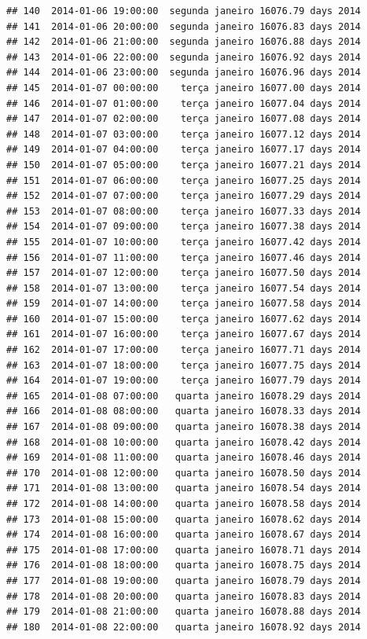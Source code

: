 \documentclass[]{book}
\begin{document}
\begin{verbatim}
## 140  2014-01-06 19:00:00  segunda janeiro 16076.79 days 2014
## 141  2014-01-06 20:00:00  segunda janeiro 16076.83 days 2014
## 142  2014-01-06 21:00:00  segunda janeiro 16076.88 days 2014
## 143  2014-01-06 22:00:00  segunda janeiro 16076.92 days 2014
## 144  2014-01-06 23:00:00  segunda janeiro 16076.96 days 2014
## 145  2014-01-07 00:00:00    terça janeiro 16077.00 days 2014
## 146  2014-01-07 01:00:00    terça janeiro 16077.04 days 2014
## 147  2014-01-07 02:00:00    terça janeiro 16077.08 days 2014
## 148  2014-01-07 03:00:00    terça janeiro 16077.12 days 2014
## 149  2014-01-07 04:00:00    terça janeiro 16077.17 days 2014
## 150  2014-01-07 05:00:00    terça janeiro 16077.21 days 2014
## 151  2014-01-07 06:00:00    terça janeiro 16077.25 days 2014
## 152  2014-01-07 07:00:00    terça janeiro 16077.29 days 2014
## 153  2014-01-07 08:00:00    terça janeiro 16077.33 days 2014
## 154  2014-01-07 09:00:00    terça janeiro 16077.38 days 2014
## 155  2014-01-07 10:00:00    terça janeiro 16077.42 days 2014
## 156  2014-01-07 11:00:00    terça janeiro 16077.46 days 2014
## 157  2014-01-07 12:00:00    terça janeiro 16077.50 days 2014
## 158  2014-01-07 13:00:00    terça janeiro 16077.54 days 2014
## 159  2014-01-07 14:00:00    terça janeiro 16077.58 days 2014
## 160  2014-01-07 15:00:00    terça janeiro 16077.62 days 2014
## 161  2014-01-07 16:00:00    terça janeiro 16077.67 days 2014
## 162  2014-01-07 17:00:00    terça janeiro 16077.71 days 2014
## 163  2014-01-07 18:00:00    terça janeiro 16077.75 days 2014
## 164  2014-01-07 19:00:00    terça janeiro 16077.79 days 2014
## 165  2014-01-08 07:00:00   quarta janeiro 16078.29 days 2014
## 166  2014-01-08 08:00:00   quarta janeiro 16078.33 days 2014
## 167  2014-01-08 09:00:00   quarta janeiro 16078.38 days 2014
## 168  2014-01-08 10:00:00   quarta janeiro 16078.42 days 2014
## 169  2014-01-08 11:00:00   quarta janeiro 16078.46 days 2014
## 170  2014-01-08 12:00:00   quarta janeiro 16078.50 days 2014
## 171  2014-01-08 13:00:00   quarta janeiro 16078.54 days 2014
## 172  2014-01-08 14:00:00   quarta janeiro 16078.58 days 2014
## 173  2014-01-08 15:00:00   quarta janeiro 16078.62 days 2014
## 174  2014-01-08 16:00:00   quarta janeiro 16078.67 days 2014
## 175  2014-01-08 17:00:00   quarta janeiro 16078.71 days 2014
## 176  2014-01-08 18:00:00   quarta janeiro 16078.75 days 2014
## 177  2014-01-08 19:00:00   quarta janeiro 16078.79 days 2014
## 178  2014-01-08 20:00:00   quarta janeiro 16078.83 days 2014
## 179  2014-01-08 21:00:00   quarta janeiro 16078.88 days 2014
## 180  2014-01-08 22:00:00   quarta janeiro 16078.92 days 2014

\end{verbatim}
\end{document}
